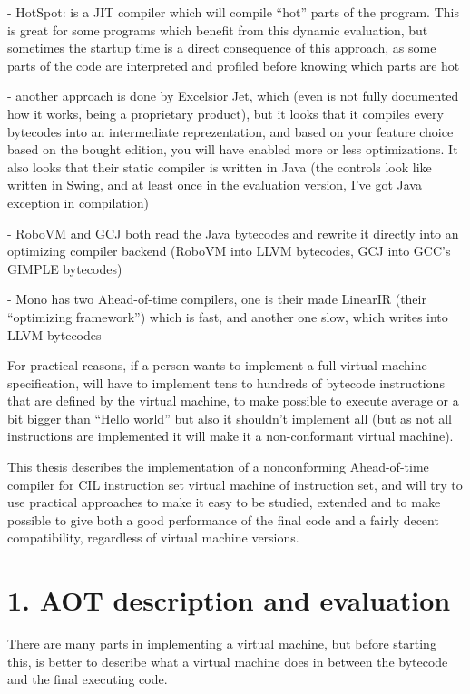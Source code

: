 \documentclass[letterpaper]{article}
\begin{document}
{}- HotSpot: is a JIT compiler which will compile ``hot'' parts of the program. This is great for some programs which
benefit from this dynamic evaluation, but sometimes the startup time is a direct consequence of this approach, as some
parts of the code are interpreted and profiled before knowing which parts are hot

{}- another approach is done by Excelsior Jet, which (even is not fully documented how it works, being a proprietary
product), but it looks that it compiles every bytecodes into an intermediate reprezentation, and based on your feature
choice based on the bought edition, you will have enabled more or less optimizations. It also looks that their static
compiler is written in Java (the controls look like written in Swing, and at least once in the evaluation version, I've
got Java exception in compilation)

{}- RoboVM and GCJ both read the Java bytecodes and rewrite it directly into an optimizing compiler backend (RoboVM into
LLVM bytecodes, GCJ into GCC's GIMPLE bytecodes)

{}- Mono has two Ahead-of-time compilers, one is their made LinearIR (their ``optimizing framework'') which is fast, and
another one slow, which writes into LLVM bytecodes


\bigskip

For practical reasons, if a person wants to implement a full virtual machine specification, will have to implement tens
to hundreds of bytecode instructions that are defined by the virtual machine, to make possible to execute average or a
bit bigger than ``Hello world'' but also it shouldn't implement all (but as not all instructions are implemented it
will make it a non-conformant virtual machine).


\bigskip

This thesis describes the implementation of a nonconforming Ahead-of-time compiler for CIL instruction set virtual
machine of instruction set, and will try to use practical approaches to make it easy to be studied, extended and to
make possible to give both a good performance of the final code and a fairly decent compatibility, regardless of
virtual machine versions.

\clearpage\section{1. AOT description and evaluation}

\bigskip

There are many parts in implementing a virtual machine, but before starting this, is better to describe what a virtual
machine does in between the bytecode and the final executing code.
\end{document}
